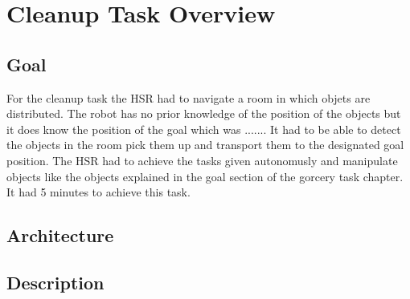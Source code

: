 \documentclass[main.tex]{subfiles}
\begin{document}
	\begingroup

	\renewcommand{\cleardoublepage}{}

	\renewcommand{\clearpage}{}

	\chapter{Cleanup Task Overview}

		
		\section{Goal}
		For the cleanup task the HSR had to navigate a room in which objets are distributed. The robot has no prior knowledge of the position of the objects but it does know the position of the goal which was ....... It had to be able to detect the objects in the room pick them up and transport them to the designated goal position. The HSR had to achieve the tasks given autonomusly and manipulate objects like the objects explained in the goal section of the gorcery task chapter. It had 5 minutes to achieve this task.
		
		\section{Architecture}
		
		\section{Description}
	  	
\end{document}
